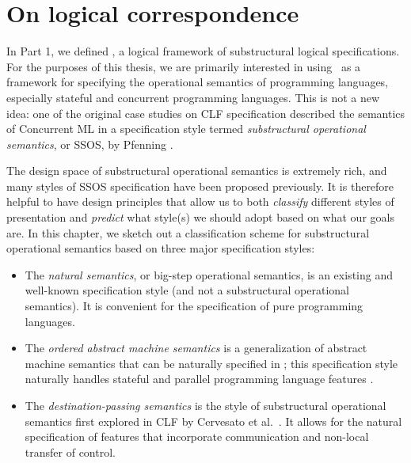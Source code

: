 \chapter{On logical correspondence}
\label{chapter-correspondence}

In Part 1, we defined \sls, a logical framework of substructural
logical specifications. For the purposes of this thesis, we are
primarily interested in using \sls~as a framework for specifying the
operational semantics of programming languages, especially stateful
and concurrent programming languages. This is not a new idea: one of
the original case studies on CLF specification described the semantics
of Concurrent ML \cite{cervesato02concurrent} in a specification style
termed {\it substructural operational semantics}, or SSOS, by Pfenning
\cite{pfenning04substructural}. 

The design space of substructural operational semantics is extremely
rich, and many styles of SSOS specification have been proposed
previously. It is therefore helpful to have design principles that
allow us to both {\it classify} different styles of presentation and
{\it predict} what style(s) we should adopt based on what our goals
are. In this chapter, we sketch out a classification scheme for
substructural operational semantics based on three major specification
styles:

\begin{itemize}
\item The {\it natural semantics}, or big-step operational semantics,
  is an existing and well-known specification style (and not a
  substructural operational semantics). It is convenient for the
  specification of pure programming languages.

\item The {\it ordered abstract machine semantics} is a generalization
  of abstract machine semantics that can be naturally specified in
  \sls; this specification style naturally handles stateful and
  parallel programming language features
  \cite{pfenning09substructural}.

\item The {\it destination-passing semantics} is the style of
  substructural operational semantics first explored in CLF by
  Cervesato et al.~\cite{cervesato02concurrent}. It allows for the
  natural specification of features that incorporate 
  communication and non-local transfer of control. %
\end{itemize}



